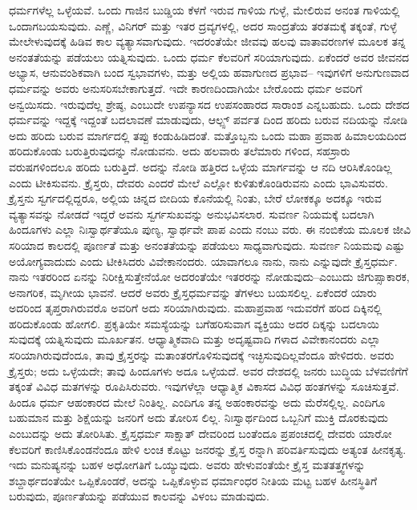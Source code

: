 ಧರ್ಮಗಳೆಲ್ಲ ಒಳ್ಳೆಯವೆ. ಒಂದು ಗಾಜಿನ ಬುಡ್ಡಿಯ ಕೆಳಗೆ ಇರುವ ಗಾಳಿಯ ಗುಳ್ಳೆ, ಮೇಲಿರುವ ಅನಂತ ಗಾಳಿಯಲ್ಲಿ ಒಂದಾಗಬಯಸುವುದು. ಎಣ್ಣೆ, ವಿನಿಗರ್​ ಮತ್ತು ಇತರ ದ್ರವ್ಯಗಳಲ್ಲಿ, ಅದರ ಸಾಂದ್ರತೆಯ ತರತಮಕ್ಕೆ ತಕ್ಕಂತೆ, ಗುಳ್ಳೆ ಮೇಲೇಳುವುದಕ್ಕೆ ಹಿಡಿವ ಕಾಲ ವ್ಯತ್ಯಾಸವಾಗುವುದು. ಇದರಂತೆಯೇ ಜೀವವು ಹಲವು ವಾತಾವರಣಗಳ ಮೂಲಕ ತನ್ನ ಅನಂತತೆಯನ್ನು ಪಡೆಯಲು ಯತ್ನಿಸುವುದು. ಒಂದು ಧರ್ಮ ಕೆಲವರಿಗೆ ಸರಿಯಾಗುವುದು. ಏಕೆಂದರೆ ಅವರ ಜೀವನದ ಅಭ್ಯಾಸ, ಆನುವಂಶಿಕವಾಗಿ ಬಂದ ಸ್ವಭಾವಗಳು, ಮತ್ತು ಅಲ್ಲಿಯ ಹವಾಗುಣದ ಪ್ರಭಾವ– ಇವುಗಳಿಗೆ ಅನುಗುಣವಾದ ಧರ್ಮವನ್ನು ಅವರು ಅನುಸರಿಸಬೇಕಾಗುತ್ತದೆ. ಇದೇ ಕಾರಣದಿಂದಾಗಿಯೇ ಬೇರೊಂದು ಧರ್ಮ ಅವರಿಗೆ ಅನ್ವಯಿಸದು. ಇರುವುದೆಲ್ಲ ಶ್ರೇಷ್ಠ, ಎಂಬುದೇ ಉಪನ್ಯಾಸದ ಉಪಸಂಹಾರದ ಸಾರಾಂಶ ಎನ್ನಬಹುದು. ಒಂದು ದೇಶದ ಧರ್ಮವನ್ನು ಇದ್ದಕ್ಕೆ ಇದ್ದಂತೆ ಬದಲಾವಣೆ ಮಾಡುವುದು, ಆಲ್ಪ್ಸ್ ಪರ್ವತ ದಿಂದ ಹರಿದು ಬರುವ ನದಿಯನ್ನು ನೋಡಿ ಅದು ಹರಿದು ಬರುವ ಮಾರ್ಗದಲ್ಲಿ ತಪ್ಪು ಕಂಡುಹಿಡಿದಂತೆ. ಮತ್ತೊಬ್ಬನು ಒಂದು ಮಹಾ ಪ್ರವಾಹ ಹಿಮಾಲಯದಿಂದ ಹರಿದುಕೊಂಡು ಬರುತ್ತಿರುವುದನ್ನು ನೋಡುವನು. ಅದು ಹಲವಾರು ತಲೆಮಾರು ಗಳಿಂದ, ಸಹಸ್ರಾರು ವರುಷಗಳಿಂದಲೂ ಹರಿದು ಬರುತ್ತಿದೆ. ಅದನ್ನು ನೋಡಿ ಹತ್ತಿರದ ಒಳ್ಳೆಯ ಮಾರ್ಗವನ್ನು ಆ ನದಿ ಆರಿಸಿಕೊಂಡಿಲ್ಲ ಎಂದು ಟೀಕಿಸುವನು. ಕ್ರೈಸ್ತರು, ದೇವರು ಎಂದರೆ ಮೇಲೆ ಎಲ್ಲೋ ಕುಳಿತುಕೊಂಡಿರುವನು ಎಂದು ಭಾವಿಸುವರು. ಕ್ರೈಸ್ತನು ಸ್ವರ್ಗದಲ್ಲಿದ್ದರೂ, ಅಲ್ಲಿಯ ಚಿನ್ನದ ಬೀದಿಯ ಕೊನೆಯಲ್ಲಿ ನಿಂತು, ಬೇರೆ ಲೋಕಕ್ಕೂ ಅದಕ್ಕೂ ಇರುವ ವ್ಯತ್ಯಾಸವನ್ನು ನೋಡದೆ ಇದ್ದರೆ ಅವನು ಸ್ವರ್ಗಸುಖವನ್ನು ಅನುಭವಿಸಲಾರ. ಸುವರ್ಣ ನಿಯಮಕ್ಕೆ ಬದಲಾಗಿ ಹಿಂದೂಗಳು ಎಲ್ಲಾ ನಿಃಸ್ವಾರ್ಥತೆಯೂ ಪುಣ್ಯ, ಸ್ವಾರ್ಥವೇ ಪಾಪ ಎಂದು ನಂಬು ವರು. ಈ ನಂಬಿಕೆಯ ಮೂಲಕ ಜೀವಿ ಸರಿಯಾದ ಕಾಲದಲ್ಲಿ ಪೂರ್ಣತೆ ಮತ್ತು ಅನಂತತೆಯನ್ನು ಪಡೆಯಲು ಸಾಧ್ಯವಾಗುವುದು. ಸುವರ್ಣ ನಿಯಮವು ಎಷ್ಟು ಅಯೋಗ್ಯವಾದುದು ಎಂದು ಟೀಕಿಸಿದರು ವಿವೇಕಾನಂದರು. ಯಾವಾಗಲೂ ನಾನು, ನಾನು ಎನ್ನುವುದೇ ಕ್ರೈಸ್ತಧರ್ಮ. ನಾನು ಇತರರಿಂದ ಏನನ್ನು ನಿರೀಕ್ಷಿಸುತ್ತೇನೆಯೋ ಅದರಂತೆಯೇ ಇತರರನ್ನು ನೋಡುವುದು–ಎಂಬುದು ಜಿಗುಪ್ಸಾಕಾರಕ, ಅನಾಗರಿಕ, ಮೃಗೀಯ ಭಾವನೆ. ಆದರೆ ಅವರು ಕ್ರೈಸ್ತಧರ್ಮವನ್ನು ತೆಗಳಲು ಬಯಸಲಿಲ್ಲ. ಏಕೆಂದರೆ ಯಾರು ಅದರಿಂದ ತೃಪ್ತರಾಗಿರುವರೊ ಅವರಿಗೆ ಅದು ಸರಿಯಾಗಿರುವುದು. ಮಹಾಪ್ರವಾಹ ಇದುವರೆಗೆ ಹರಿದ ದಿಕ್ಕಿನಲ್ಲಿ ಹರಿದುಕೊಂಡು ಹೋಗಲಿ. ಪ್ರಕೃತಿಯೇ ಸಮಸ್ಯೆಯನ್ನು ಬಗೆಹರಿಸುವಾಗ ವ್ಯಕ್ತಿಯು ಅದರ ದಿಕ್ಕನ್ನು ಬದಲಾಯಿ ಸುವುದಕ್ಕೆ ಯತ್ನಿಸುವುದು ಮೂರ್ಖತನ. ಆಧ್ಯಾತ್ಮಿಕವಾದಿ ಮತ್ತು ಅದೃಷ್ಟವಾದಿ ಗಳಾದ ವಿವೇಕಾನಂದರು ಎಲ್ಲಾ ಸರಿಯಾಗಿರುವುದೆಂದೂ, ತಾವು ಕ್ರೈಸ್ತರನ್ನು ಮತಾಂತರಗೊಳಿಸುವುದಕ್ಕೆ ಇಚ್ಛಿಸುವುದಿಲ್ಲವೆಂದೂ ಹೇಳಿದರು. ಅವರು ಕ್ರೈಸ್ತರು; ಅದು ಒಳ್ಳೆಯದೇ; ತಾವು ಹಿಂದೂಗಳು ಅದೂ ಒಳ್ಳೆಯದೆ. ಅವರ ದೇಶದಲ್ಲಿ ಜನರು ಬುದ್ಧಿಯ ಬೆಳವಣಿಗೆಗೆ ತಕ್ಕಂತೆ ವಿವಿಧ ಮತಗಳನ್ನು ರೂಪಿಸಿರುವರು. ಇವುಗಳೆಲ್ಲಾ ಆಧ್ಯಾತ್ಮಿಕ ವಿಕಾಸದ ವಿವಿಧ ಹಂತಗಳನ್ನು ಸೂಚಿಸುತ್ತವೆ. ಹಿಂದೂ ಧರ್ಮ ಆಹಂಕಾರದ ಮೇಲೆ ನಿಂತಿಲ್ಲ. ಎಂದಿಗೂ ತನ್ನ ಅಹಂಕಾರವನ್ನು ಅದು ಮೆರೆಸಲ್ಲಿಲ್ಲ. ಎಂದಿಗೂ ಬಹುಮಾನ ಮತ್ತು ಶಿಕ್ಷೆಯನ್ನು ಜನರಿಗೆ ಅದು ತೋರಿಸ ಲಿಲ್ಲ. ನಿಃಸ್ವಾರ್ಥದಿಂದ ಒಬ್ಬನಿಗೆ ಮುಕ್ತಿ ದೊರಕುವುದು ಎಂಬುದನ್ನು ಅದು ತೋರಿಸಿತು. ಕ್ರೈಸ್ತಧರ್ಮ ಸಾಕ್ಷಾತ್​ ದೇವರಿಂದ ಬಂತೆಂದೂ ಪ್ರಪಂಚದಲ್ಲಿ ದೇವರು ಯಾರೋ ಕೆಲವರಿಗೆ ಕಾಣಿಸಿಕೊಂಡನೆಂದೂ ಹೇಳಿ ಲಂಚ ಕೊಟ್ಟು ಜನರನ್ನು ಕ್ರೈಸ್ತ ರನ್ನಾಗಿ ಪರಿವರ್ತಿಸುವುದು ಅತ್ಯಂತ ಹೀನಕೃತ್ಯ. ಇದು ಮನುಷ್ಯನನ್ನು ಬಹಳ ಅಧೋಗತಿಗೆ ಒಯ್ಯುವುದು. ಅವರು ಹೇಳುವಂತೆಯೇ ಕ್ರೈಸ್ತ ಮತತತ್ತ್ವಗಳನ್ನು ಶಬ್ದಾರ್ಥದಂತೆಯೇ ಒಪ್ಪಿಕೊಂಡರೆ, ಅದನ್ನು ಒಪ್ಪಿಕೊಳ್ಳುವ ಧರ್ಮಾಂಧರ ನೀತಿಯ ಮಟ್ಟ ಬಹಳ ಹೀನಸ್ಥಿತಿಗೆ ಬರುವುದು, ಪೂರ್ಣತೆಯನ್ನು ಪಡೆಯುವ ಕಾಲವನ್ನು ವಿಳಂಬ ಮಾಡುವುದು.

